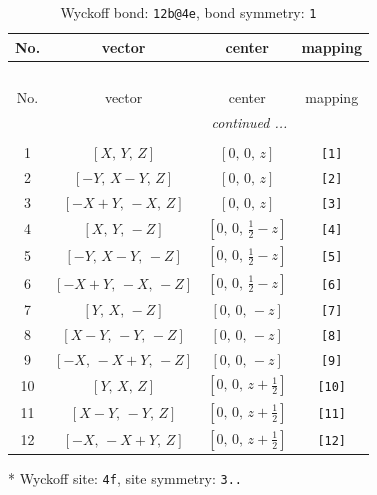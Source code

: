 \documentclass[fleqn,8pt]{jsarticle}
\begin{document}
\begin{longtable}{cccc}
\caption{Wyckoff bond: {\tt 12b@4e}, bond symmetry: {\tt 1}}
 \\
 \hline \hline
No. & vector & center & mapping \\ \hline \endfirsthead

\multicolumn{3}{l}{\tablename\ \thetable{}} \\
 \hline \hline
No. & vector & center & mapping \\ \hline \endhead

 \hline \hline
\multicolumn{3}{r}{\footnotesize\it continued ...} \\ \endfoot

 \hline \hline
\multicolumn{3}{r}{} \\ \endlastfoot

1 & $\left[ X,\, Y,\, Z \right]$ & $\left[ 0,\, 0,\, z \right]$ & {\tt [1]} \\ \hline
2 & $\left[ - Y,\, X - Y,\, Z \right]$ & $\left[ 0,\, 0,\, z \right]$ & {\tt [2]} \\ \hline
3 & $\left[ - X + Y,\, - X,\, Z \right]$ & $\left[ 0,\, 0,\, z \right]$ & {\tt [3]} \\ \hline
4 & $\left[ X,\, Y,\, - Z \right]$ & $\left[ 0,\, 0,\, \frac{1}{2} - z \right]$ & {\tt [4]} \\ \hline
5 & $\left[ - Y,\, X - Y,\, - Z \right]$ & $\left[ 0,\, 0,\, \frac{1}{2} - z \right]$ & {\tt [5]} \\ \hline
6 & $\left[ - X + Y,\, - X,\, - Z \right]$ & $\left[ 0,\, 0,\, \frac{1}{2} - z \right]$ & {\tt [6]} \\ \hline
7 & $\left[ Y,\, X,\, - Z \right]$ & $\left[ 0,\, 0,\, - z \right]$ & {\tt [7]} \\ \hline
8 & $\left[ X - Y,\, - Y,\, - Z \right]$ & $\left[ 0,\, 0,\, - z \right]$ & {\tt [8]} \\ \hline
9 & $\left[ - X,\, - X + Y,\, - Z \right]$ & $\left[ 0,\, 0,\, - z \right]$ & {\tt [9]} \\ \hline
10 & $\left[ Y,\, X,\, Z \right]$ & $\left[ 0,\, 0,\, z + \frac{1}{2} \right]$ & {\tt [10]} \\ \hline
11 & $\left[ X - Y,\, - Y,\, Z \right]$ & $\left[ 0,\, 0,\, z + \frac{1}{2} \right]$ & {\tt [11]} \\ \hline
12 & $\left[ - X,\, - X + Y,\, Z \right]$ & $\left[ 0,\, 0,\, z + \frac{1}{2} \right]$ & {\tt [12]} \\
\end{longtable}
* Wyckoff site: {\tt 4f}, site symmetry: {\tt 3..}
\end{document}
